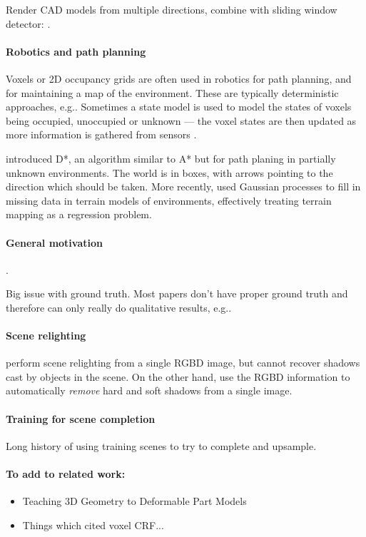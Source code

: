 \documentclass[10pt,twocolumn,letterpaper]{article}
\makeatletter
\renewcommand*{\eg}{e.g.\@\xspace}
\makeatother
\begin{document}
Render CAD models from multiple directions, combine with sliding window detector: \cite{song-eccv-2014}.


\paragraph{Robotics and path planning}
Voxels or 2D occupancy grids are often used in robotics for path planning, and for maintaining a map of the environment. 
These are typically deterministic approaches, \eg \cite{jetchev-icra-2010}. Sometimes a state model is used to model the states of voxels being occupied, unoccupied or unknown --- the voxel states are then updated as more information is gathered from sensors \cite{toussaint-techreport-2007}.

\cite{stentz-icra-1994} introduced D*, an algorithm similar to A* but for path planing in partially unknown environments. 
The world is in boxes, with arrows pointing to the direction which should be taken.
More recently, \cite{plagemann-iros-2008} used Gaussian processes to fill in missing data in terrain models of environments, effectively treating terrain mapping as a regression problem.

\paragraph{General motivation}

 \cite{nan-acm-2012}.

Big issue with ground truth. Most papers don't have proper ground truth and therefore can only really do qualitative results, \eg \cite{all the papers...}.

\paragraph{Scene relighting}
\cite{ikeda-acpr-2013} perform scene relighting from a single RGBD image, but cannot recover shadows cast by objects in the scene.
On the other hand, \cite{xiao-cvpr-2014} use the RGBD information to automatically \textit{remove} hard and soft shadows from a single image.

\paragraph{Training for scene completion}
Long history of using training scenes to try to complete and upsample.

\paragraph{To add to related work:}
\begin{itemize}
\item Teaching 3D Geometry to Deformable Part Models
\item Things which cited voxel CRF...
\end{itemize}
\end{document}
